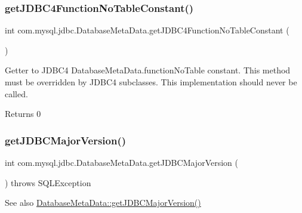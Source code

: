 \subsubsection{\texorpdfstring{get\+J\+D\+B\+C4\+Function\+No\+Table\+Constant()}{getJDBC4FunctionNoTableConstant()}}
{\footnotesize\ttfamily int com.\+mysql.\+jdbc.\+Database\+Meta\+Data.\+get\+J\+D\+B\+C4\+Function\+No\+Table\+Constant (\begin{DoxyParamCaption}{ }\end{DoxyParamCaption})\hspace{0.3cm}{\ttfamily [protected]}}

Getter to J\+D\+B\+C4 Database\+Meta\+Data.\+function\+No\+Table constant. This method must be overridden by J\+D\+B\+C4 subclasses. This implementation should never be called.

\begin{DoxyReturn}{Returns}
0 
\end{DoxyReturn}
\mbox{\label{classcom_1_1mysql_1_1jdbc_1_1_database_meta_data_a7e81f0258c5a1ce3c578c811e683ee41}} 
\subsubsection{\texorpdfstring{get\+J\+D\+B\+C\+Major\+Version()}{getJDBCMajorVersion()}}
{\footnotesize\ttfamily int com.\+mysql.\+jdbc.\+Database\+Meta\+Data.\+get\+J\+D\+B\+C\+Major\+Version (\begin{DoxyParamCaption}{ }\end{DoxyParamCaption}) throws S\+Q\+L\+Exception}

\begin{DoxySeeAlso}{See also}
\mbox{\hyperlink{classcom_1_1mysql_1_1jdbc_1_1_database_meta_data_a7e81f0258c5a1ce3c578c811e683ee41}{Database\+Meta\+Data\+::get\+J\+D\+B\+C\+Major\+Version()}} 
\end{DoxySeeAlso}
\mbox{\label{classcom_1_1mysql_1_1jdbc_1_1_database_meta_data_aa915d1fb8aa1d88240c8989faea490bc}} 
